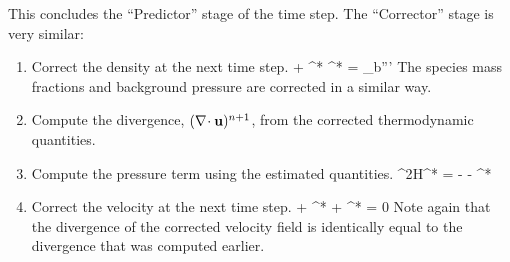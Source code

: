\noindent
This concludes the ``Predictor'' stage of the time step.  The ``Corrector'' stage is very similar:

\begin{enumerate}

\item Correct the density at the next time step.
\be
{} +  \nabla\!\cdot \rho^* \bu^* = \dm_b'''
\ee
The species mass fractions and background pressure are corrected in a similar way.

\item Compute the divergence, $(\nabla\!\cdot {\bf u})^{n+1}$, from the corrected thermodynamic quantities.

\item Compute the pressure term using the estimated quantities.
\be
\label{eqn_corrector_poisson2}
\nabla^2{\cal H}^* = - 
   - \nabla\!\cdot {}^*
\ee

\item Correct the velocity at the next time step.
\be
{} + ^* + ^*  = 0
\ee
Note again that the divergence of the corrected velocity field is identically equal to the divergence that was computed earlier.


\end{enumerate}
